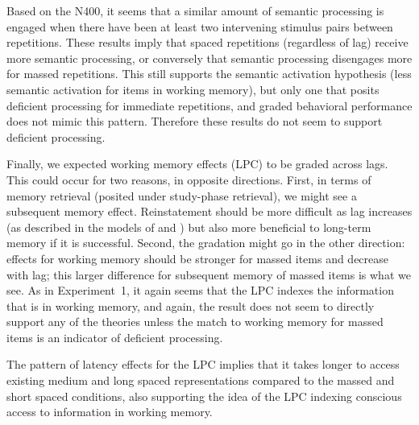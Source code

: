 Based on the N400, it seems that a similar amount of semantic processing is engaged when there have been at least two intervening stimulus pairs between repetitions.
These results imply that spaced repetitions (regardless of lag) receive more semantic processing, or conversely that semantic processing disengages more for massed repetitions.  This still supports the  semantic activation hypothesis (less semantic activation for items in working memory), but only one that posits deficient processing for immediate repetitions, and graded behavioral performance does not mimic this pattern.  Therefore these results do not seem to support deficient processing.

Finally, we expected working memory effects (LPC) to be graded across lags.  This could occur for two reasons, in opposite directions.  First, in terms of memory retrieval (posited under study-phase retrieval), we might see a subsequent memory effect.  Reinstatement should be more difficult as lag increases (as described in the models of  and ) but also more beneficial to long-term memory if it is successful.
Second, the gradation might go in the other direction: effects for working memory should be stronger for massed items and decrease with lag; this larger difference for subsequent memory of massed items is what we see.
As in Experiment~1, it again seems that the LPC indexes the information that is in working memory, and again, the result does not seem to directly support any of the theories unless the match to working memory for massed items is an indicator of deficient processing.

The pattern of latency effects for the LPC implies that it takes longer to access existing medium and long spaced representations compared to the massed and short spaced conditions, also supporting the idea of the LPC indexing conscious access to information in working memory.


